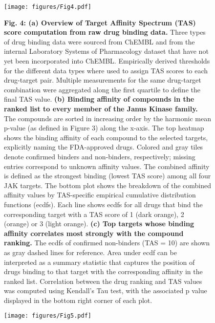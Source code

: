 \documentclass{article}
\begin{document}

\begin{figure}
  \centering
  \texttt{[image: figures/Fig4.pdf]}
\end{figure}

\begin{figure}
  \caption{\textbf{Fig. 4: (a) Overview of Target Affinity Spectrum (TAS) score computation from raw drug binding data.} Three types of drug binding data were sourced from ChEMBL and from the internal Laboratory Systems of Pharmacology dataset that have not yet been incorporated into ChEMBL. Empirically derived thresholds for the different data types where used to assign TAS scores to each drug-target pair. Multiple measurements for the same drug-target combination were aggregated along the first quartile to define the final TAS value. \textbf{(b) Binding affinity of compounds in the ranked list to every member of the Janus Kinase family.} The compounds are sorted in increasing order by the harmonic mean p-value (as defined in Figure 3) along the x-axis. The top heatmap shows the binding affinity of each compound to the selected targets, explicitly naming the FDA-approved drugs. Colored and gray tiles denote confirmed binders and non-binders, respectively; missing entries correspond to unknown affinity values. The combined affinity is defined as the strongest binding (lowest TAS score) among all four JAK targets. The bottom plot shows the breakdown of the combined affinity values by TAS-specific empirical cumulative distribution functions (ecdfs). Each line shows ecdfs for all drugs that bind the corresponding target with a TAS score of 1 (dark orange), 2 (orange) or 3 (light orange). \textbf{(c) Top targets whose binding affinity correlates most strongly with the compound ranking.} The ecdfs of confirmed non-binders (TAS = 10) are shown as gray dashed lines for reference. Area under ecdf can be interpreted as a summary statistic that captures the position of drugs binding to that target with the corresponding affinity in the ranked list. Correlation between the drug ranking and TAS values was computed using Kendall’s Tau test, with the associated p value displayed in the bottom right corner of each plot.}
\end{figure}


\begin{landscape}
  \begin{figure}
    \centering
    \texttt{[image: figures/Fig5.pdf]}
  \end{figure}
\end{landscape}
\end{document}
